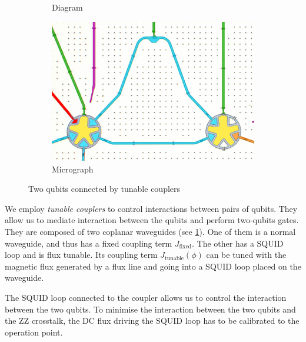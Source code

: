 \begin{figure}[b]
    \centering
    \begin{subfigure}{0.65\textwidth}
        \centering
        
        \vspace{-1cm}
        \caption{Diagram}
        \label{fig:tun_coupl}
    \end{subfigure}
    \hspace{0.3cm}
    \begin{subfigure}{0.25\textwidth}
        \centering
        \includegraphics[width=\textwidth]{Images/Chap1/tun_couplers.png} 
        \caption{Micrograph}
        \label{fig:tun_coupl_real}
    \end{subfigure}
    \caption{Two qubits connected by tunable couplers}
    \label{fig:tun_coupl_tot}
\end{figure}

We employ \emph{tunable couplers} \cite{tun_coupler, HernandezAnton2023} to control interactions between pairs of qubits.
They allow us to mediate interaction between the qubits and perform two-qubits gates.
They are composed of two coplanar waveguides (see \cref{fig:tun_coupl}).
One of them is a normal waveguide, and thus has a fixed coupling term $J_\text{fixed}$.
The other has a SQUID loop and is flux tunable.
Its coupling term $J_\text{tunable}(\phi)$ can be tuned with the magnetic flux generated by a flux line and going into a SQUID loop placed on the waveguide.

The SQUID loop connected to the coupler allows us to control the interaction between the two qubits. 
To minimise the interaction between the two qubits and the ZZ crosstalk, the DC flux driving the SQUID loop has to be calibrated to the operation point.

